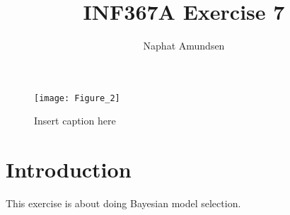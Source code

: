 \documentclass[12pt]{article}
\begin{document}
\title{\textbf{INF367A Exercise 7}}
\author{Naphat Amundsen}
\maketitle
\sectionfont{\fontsize{14}{15}\selectfont}
\subsectionfont{\fontsize{12}{15}\selectfont}
\subsubsectionfont{\fontsize{12}{15}\selectfont}
\graphicspath{ {./images/} }

\ifx
\begin{figure}[H]
	\centering
	\texttt{[image: Figure\_2]}
	\caption{Insert caption here}
\end{figure}
\fi

\section*{Introduction}
This exercise is about doing Bayesian model selection. 
\end{document}

